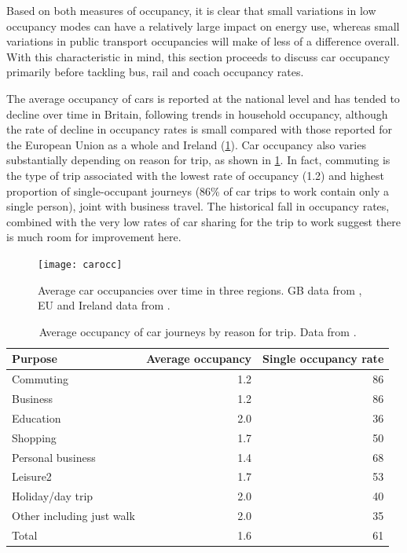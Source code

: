 Based on both measures of occupancy, it is clear that small variations in
low occupancy modes can have
a relatively large impact on energy use, whereas small variations in public
transport occupancies will make of less of a difference overall. With this characteristic
in mind, this section proceeds to discuss car occupancy primarily before
tackling bus, rail and coach occupancy rates. 

The average occupancy of cars is reported at the national level and has tended
to decline over time in Britain, following trends in household occupancy,
although the rate of decline in occupancy rates is small compared
with those reported for the European Union as a whole and Ireland
(\cref{foccupancy}). Car occupancy also varies substantially depending
on reason for trip, as shown in \cref{toccupancy}. In fact, commuting is
the type of trip associated with the lowest rate of occupancy (1.2) and highest
proportion of single-occupant journeys (86\% of car trips to work contain
only a single person), joint with
business travel. The historical fall in occupancy rates, combined with
the very low rates of car sharing for the trip to work suggest there is much
room for improvement here.

\begin{figure}[h]
  \centerline{
    \texttt{[image: carocc]}}
  \caption[Average car occupancies over time in three regions]
  {Average car occupancies over time in three regions.
  GB data from \citet[table 0905]{NationalTravelStatistics2012},
  EU and Ireland data from \citep{Jennings2013}.}
  \label{foccupancy}
\end{figure}

\begin{table}[htbp]
\caption[Average occupancy of car journeys by reason for trip]
{Average occupancy of car journeys by reason for trip.
Data from \citet[table 0906]{NationalTravelStatistics2012}.}
\begin{center}
\begin{tabular}{lrr}
\toprule
{Purpose} & Average occupancy & Single occupancy rate \\ \midrule
Commuting & 1.2 & 86 \\
Business & 1.2 & 86 \\
Education & 2.0 & 36 \\
Shopping & 1.7 & 50 \\
Personal business & 1.4 & 68 \\
Leisure2 & 1.7 & 53 \\
Holiday/day trip & 2.0 & 40 \\
Other including just walk & 2.0 & 35 \\
Total & 1.6 & 61 \\
\bottomrule
\end{tabular}\end{center}
\label{toccupancy}
\end{table}

